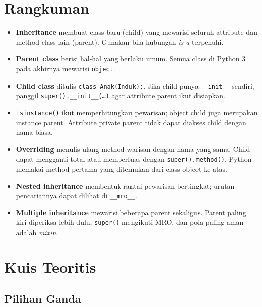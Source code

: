\section{Rangkuman}

\begin{itemize}
  \item \textbf{Inheritance} membuat class baru (child) yang mewarisi seluruh attribute dan method class lain (parent). Gunakan bila hubungan \emph{is-a} terpenuhi.
  \item \textbf{Parent class} berisi hal-hal yang berlaku umum. Semua class di Python 3 pada akhirnya mewarisi \texttt{object}.
  \item \textbf{Child class} ditulis \texttt{class Anak(Induk):}. Jika child punya \texttt{\_\_init\_\_} sendiri, panggil \texttt{super().\_\_init\_\_(\ldots)} agar attribute parent ikut disiapkan.
  \item \texttt{isinstance()} ikut memperhitungkan pewarisan; object child juga merupakan instance parent. Attribute private parent tidak dapat diakses child dengan nama biasa.
  \item \textbf{Overriding} menulis ulang method warisan dengan nama yang sama. Child dapat mengganti total atau memperluas dengan \texttt{super().method()}. Python memakai method pertama yang ditemukan dari class object ke atas.
  \item \textbf{Nested inheritance} membentuk rantai pewarisan bertingkat; urutan pencariannya dapat dilihat di \texttt{\_\_mro\_\_}.
  \item \textbf{Multiple inheritance} mewarisi beberapa parent sekaligus. Parent paling kiri diperiksa lebih dulu, \texttt{super()} mengikuti MRO, dan pola paling aman adalah \emph{mixin}.
\end{itemize}

\section{Kuis Teoritis}

\subsection{Pilihan Ganda}

